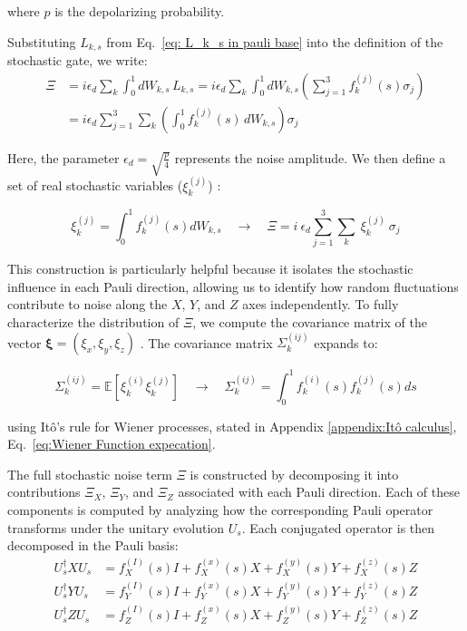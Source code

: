 \documentclass[9pt,a4paper,twocolumn,twoside]{tau-class/tau}
\begin{document}
where $p$ is the depolarizing probability. 

Substituting $L_{k,s}$ from Eq.~\eqref{eq: L_k_s in pauli base} into the definition of the stochastic gate, we write:
\begin{equation}
\begin{aligned}
    \Xi &= i\epsilon_d \sum_k \int_0^1 dW_{k,s} \, L_{k,s}
        = i\epsilon_d \sum_k \int_0^1 dW_{k,s} \left( \sum_{j=1}^{3} f_k^{(j)}(s) \sigma_j \right) \\
        &= i \epsilon_d \sum_{j=1}^{3}  \sum_k \left( \int_0^1 f_k^{(j)}(s) \, dW_{k,s} \right) \sigma_j
\end{aligned}
\label{eq:Xi_integral_expansion}
\end{equation}

Here, the parameter $\epsilon_d = \sqrt{\frac{p}{4}}$ represents the noise amplitude.
We then define a set of real stochastic variables (\( \xi_k^{(j)}\)) \cite{dibartolomeo2023noisy}:

\begin{equation}
   \xi_k^{(j)} = \int_0^1 f_k^{(j)}(s) dW_{k,s}
    \quad \rightarrow \quad
    \Xi = i \ \epsilon_d \sum_{j=1}^{3} \sum_k  \ \xi_k^{(j)}\  \sigma_j
    \label{eq: Xi as sum}
\end{equation}

This construction is particularly helpful because it isolates the stochastic influence in each Pauli direction, allowing us to identify how random fluctuations contribute to noise along the $X$, $Y$, and $Z$ axes independently. 
To fully characterize the distribution of $\Xi$, we compute the covariance matrix of the vector $\boldsymbol{\xi} = (\xi_x, \xi_y, \xi_z)$ \cite{dibartolomeo2023noisy}. The covariance matrix $\Sigma_{k}^{(ij)}$ expands to:

\begin{equation}
    \Sigma_{k}^{(ij)} = \mathbb{E}[\xi_k^{(i)} \xi_k^{(j)}] 
    \quad \rightarrow \quad 
    \Sigma_{k}^{(ij)} = \int_0^1 f_k^{(i)}(s) f_k^{(j)}(s) ds
    \label{eq: cov matrix}
\end{equation}

using Itô’s rule for Wiener processes, stated in Appendix \ref{appendix:Itô calculus}, Eq.~\eqref{eq:Wiener Function expecation}.

The full stochastic noise term $\Xi$ is constructed by decomposing it into contributions $\Xi_X$, $\Xi_Y$, and $\Xi_Z$ associated with each Pauli direction. Each of these components is computed by analyzing how the corresponding Pauli operator transforms under the unitary evolution $U_s$. Each conjugated operator is then decomposed in the Pauli basis: 
\begin{align}
    U_s^\dagger X U_s &= f_X^{(I)}(s)I +f_X^{(x)}(s) X + f_X^{(y)}(s) Y + f_X^{(z)}(s) Z\\
    U_s^\dagger Y U_s &= f_Y^{(I)}(s)I +f_Y^{(x)}(s) X + f_Y^{(y)}(s) Y + f_Y^{(z)}(s) Z\\
    U_s^\dagger Z U_s &= f_Z^{(I)}(s)I +f_Z^{(x)}(s) X + f_Z^{(y)}(s) Y + f_Z^{(z)}(s) Z
\end{align}
\end{document}
